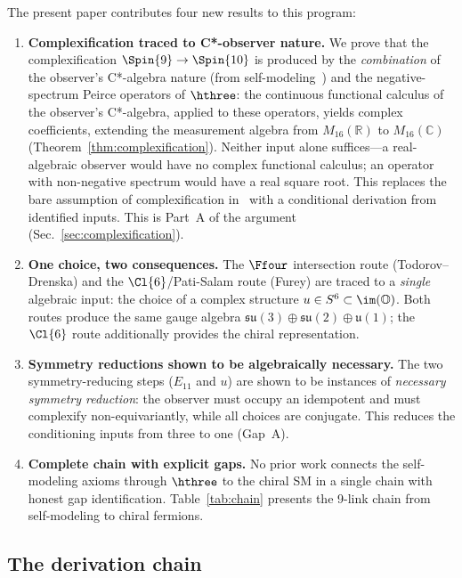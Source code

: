The present paper contributes four new results to this program:
\begin{enumerate}
\item \textbf{Complexification traced to C*-observer nature.} We prove that the
complexification $\Spin{9} \to \Spin{10}$ is produced by the
\emph{combination} of the observer's C*-algebra nature (from
self-modeling~\cite{Paper5}) and the negative-spectrum Peirce operators
of $\hthree$: the continuous functional calculus of the observer's C*-algebra,
applied to these operators, yields complex coefficients, extending
the measurement algebra from
$M_{16}(\mathbb{R})$ to $M_{16}(\mathbb{C})$
(Theorem~\ref{thm:complexification}).  Neither input alone suffices---a
real-algebraic observer would have no complex functional calculus; an
operator with non-negative spectrum would have a real square root.  This
replaces the bare assumption of complexification in~\cite{Boyle2020} with
a conditional derivation from identified inputs.
This is Part~A of the argument (Sec.~\ref{sec:complexification}).
\item \textbf{One choice, two consequences.} The $\Ffour$ intersection route
(Todorov--Drenska) and the $\Cl{6}$/Pati-Salam route (Furey) are traced to
a \emph{single} algebraic input: the choice of a complex structure $u \in
S^6 \subset \im(\mathbb{O})$. Both routes produce the same gauge algebra
$\mathfrak{su}(3) \oplus \mathfrak{su}(2) \oplus \mathfrak{u}(1)$; the
$\Cl{6}$ route additionally provides the chiral representation.
\item \textbf{Symmetry reductions shown to be algebraically necessary.}  The two
symmetry-reducing steps ($E_{11}$ and $u$) are shown to be instances
of \emph{necessary symmetry reduction}: the observer must occupy
an idempotent and must complexify non-equivariantly, while all choices are
conjugate.  This reduces the conditioning inputs from three to one (Gap~A).
\item \textbf{Complete chain with explicit gaps.} No prior work connects the
self-modeling axioms through $\hthree$ to the chiral SM in a single chain
with honest gap identification. Table~\ref{tab:chain} presents the 9-link
chain from self-modeling to chiral fermions.
\end{enumerate}

\subsection{The derivation chain}
\label{subsec:chain}

